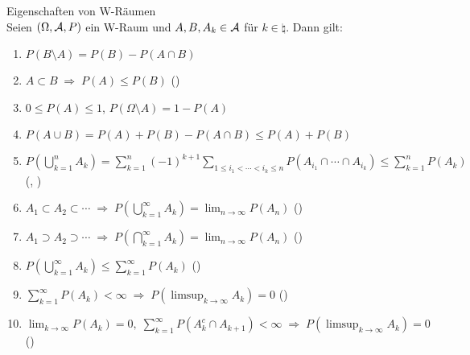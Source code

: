 \begin{Satz}{Eigenschaften von W-Räumen}\\
    Seien $(\Omega, \mathcal{A}, P)$ ein W-Raum und $A, B, A_k \in \mathcal{A}$ für $k \in \natural$. Dann gilt:
    \begin{enumerate}
        \item
        $P(B \setminus A) = P(B) - P(A \cap B)$

        \item
        $A \subset B \;\Rightarrow\; P(A) \le P(B)$
        ()

        \item
        $0 \le P(A) \le 1$, $P(\Omega \setminus A) = 1 - P(A)$

        \item
        $P(A \cup B) = P(A) + P(B) - P(A \cap B) \le P(A) + P(B)$

        \item
        $P(\bigcup_{k=1}^n A_k) = \sum_{k=1}^n (-1)^{k+1} \sum_{1 \le i_1 < \dotsb < i_k \le n}
        P(A_{i_1} \cap \dotsb \cap A_{i_k}) \le \sum_{k=1}^n P(A_k)$\\
        (,
        )

        \item
        $A_1 \subset A_2 \subset \dotsb \;\Rightarrow\;
        P(\bigcup_{k=1}^\infty A_k) = \lim_{n \to \infty} P(A_n)$
        ()

        \item
        $A_1 \supset A_2 \supset \dotsb \;\Rightarrow\;
        P(\bigcap_{k=1}^\infty A_k) = \lim_{n \to \infty} P(A_n)$
        ()

        \item
        $P(\bigcup_{k=1}^\infty A_k) \le \sum_{k=1}^\infty P(A_k)$
        ()

        \item
        $\sum_{k=1}^\infty P(A_k) < \infty \;\Rightarrow\; P(\limsup_{k \to \infty} A_k) = 0$
        ()

        \item
        $\lim_{k \to \infty} P(A_k) = 0,\; \sum_{k=1}^\infty P(A_k^c \cap A_{k+1}) < \infty
        \;\Rightarrow\; P(\limsup_{k \to \infty} A_k) = 0$\\
        ()
    \end{enumerate}
\end{Satz}

